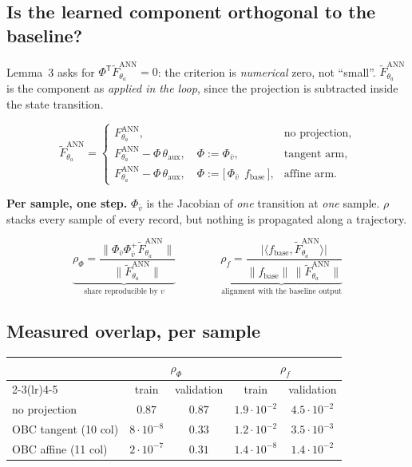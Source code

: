 \documentclass[12pt]{article}
\newcommand{\T}{\mathsf{T}}
\newcommand{\fbase}{f_{\mathrm{base}}}
\newcommand{\ANN}{\mathrm{ANN}}
\newcommand{\thaux}{\theta_{\mathrm{aux}}}
\newcommand{\Phiv}{\Phi_{\bar v}}
\newcommand{\Fann}{F^{\ANN}_{\theta_a}}
\newcommand{\Ftil}{\widetilde F^{\ANN}_{\theta_a}}
\newcommand{\panel}[1]{\subsection*{\Large #1}\vspace{1mm}}
\begin{document}
\panel{Is the learned component orthogonal to the baseline?}

Lemma~3 asks for $\Phi^{\T}\Ftil=0$: the criterion is \emph{numerical} zero,
not ``small''. $\Ftil$ is the component as \emph{applied in the loop}, since
the projection is subtracted inside the state transition.

\begin{equation*}
\Ftil=
\begin{cases}
\Fann, & \text{no projection},\\[1mm]
\Fann-\Phi\,\thaux,\quad \Phi:=\Phiv, & \text{tangent arm},\\[1mm]
\Fann-\Phi\,\thaux,\quad \Phi:=\bigl[\,\Phiv\ \ \fbase\,\bigr], & \text{affine arm}.
\end{cases}
\end{equation*}

\textbf{Per sample, one step.} $\Phiv$ is the Jacobian of \emph{one} transition
at \emph{one} sample. $\rho$ stacks every sample of every record, but nothing is
propagated along a trajectory.

\begin{equation*}
\underbrace{\rho_{\Phi}=\frac{\bigl\|\Phiv\Phiv^{+}\Ftil\bigr\|}{\bigl\|\Ftil\bigr\|}}
           _{\text{share reproducible by }v}
\qquad\qquad
\underbrace{\rho_{f}=\frac{\bigl|\langle \fbase,\Ftil\rangle\bigr|}
              {\bigl\|\fbase\bigr\|\,\bigl\|\Ftil\bigr\|}}
           _{\text{alignment with the baseline output}}
\end{equation*}

\newpage
\panel{Measured overlap, per sample}

\begin{center}
\begin{tabular}{@{}lcccc@{}}
\toprule
& \multicolumn{2}{c}{$\rho_{\Phi}$} & \multicolumn{2}{c}{$\rho_{f}$}\\
\cmidrule(lr){2-3}\cmidrule(lr){4-5}
& train & validation & train & validation\\
\midrule
no projection        & $0.87$            & $0.87$   & $1.9\cdot10^{-2}$ & $4.5\cdot10^{-2}$\\
OBC tangent (10 col) & $8\cdot10^{-8}$   & $0.33$   & $1.2\cdot10^{-2}$ & $3.5\cdot10^{-3}$\\
OBC affine (11 col)  & $2\cdot10^{-7}$   & $0.31$   & $1.4\cdot10^{-8}$ & $1.4\cdot10^{-2}$\\
\bottomrule
\end{tabular}
\end{center}
\end{document}
